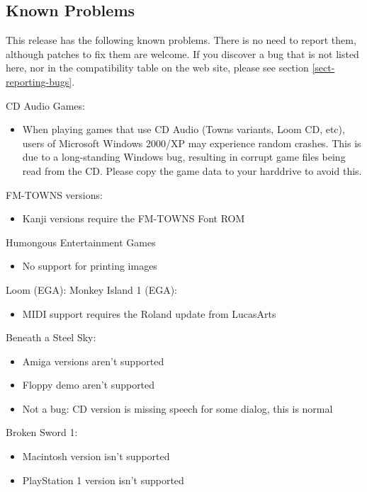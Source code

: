 

\subsection{Known Problems}

This release has the following known problems. There is no need to report them,
although patches to fix them are welcome. If you discover a bug that is not
listed here, nor in the compatibility table on the web site, please see
section \ref{sect-reporting-bugs}.

CD Audio Games:
  \begin{itemize}
  \item When playing games that use CD Audio (Towns variants, Loom CD, etc),
                 users of Microsoft Windows 2000/XP may experience random crashes.
                 This is due to a long-standing Windows bug, resulting in corrupt
                 game files being read from the CD. Please copy the game data to
                 your harddrive to avoid this.
  \end{itemize}
FM-TOWNS versions:
  \begin{itemize}
  \item Kanji versions require the FM-TOWNS Font ROM
  \end{itemize}
Humongous Entertainment Games
  \begin{itemize}
  \item No support for printing images
  \end{itemize}
Loom (EGA):
Monkey Island 1 (EGA):
  \begin{itemize}
  \item MIDI support requires the Roland update from LucasArts
  \end{itemize}
Beneath a Steel Sky:
  \begin{itemize}
  \item Amiga versions aren't supported
  \item Floppy demo aren't supported
  \item Not a bug: CD version is missing speech for some dialog, this is
                 normal
  \end{itemize}
Broken Sword 1:
  \begin{itemize}
  \item Macintosh version isn't supported
  \item PlayStation 1 version isn't supported
  \end{itemize}
